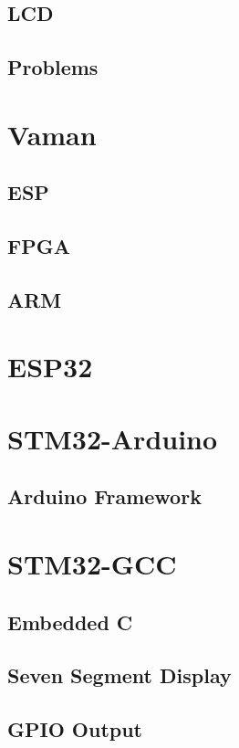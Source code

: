 \documentclass[journal]{IEEEtran}
\begin{document}
\subsection{LCD}

\subsection{Problems}

\newpage
\section{Vaman}
\subsection{ESP}
%

\subsection{FPGA}

\subsection{ARM}

\newpage
\section{ESP32}

\newpage
\section{STM32-Arduino}
\subsection{Arduino Framework}

\newpage
\section{STM32-GCC}
\subsection{Embedded C}

\subsection{Seven Segment Display}

\subsection{GPIO Output}

\end{document}
